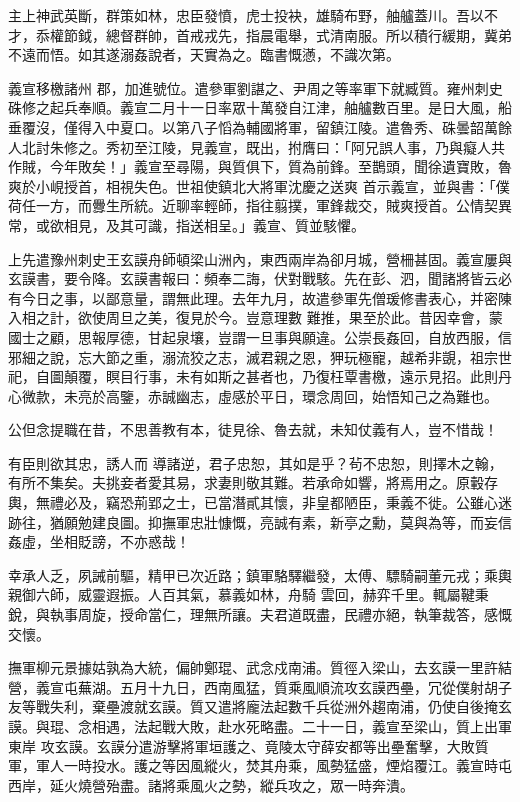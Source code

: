 \begin{pinyinscope}
 主上神武英斷，群策如林，忠臣發憤，虎士投袂，雄騎布野，舳艫蓋川。吾以不才，忝權節鉞，總督群帥，首戒戎先，指晨電舉，式清南服。所以積行緩期，冀弟不遠而悟。如其遂溺姦說者，天實為之。臨書慨懣，不識次第。



 義宣移檄諸州
 郡，加進號位。遣參軍劉諶之、尹周之等率軍下就臧質。雍州刺史硃修之起兵奉順。義宣二月十一日率眾十萬發自江津，舳艫數百里。是日大風，船垂覆沒，僅得入中夏口。以第八子慆為輔國將軍，留鎮江陵。遣魯秀、硃曇韶萬餘人北討朱修之。秀初至江陵，見義宣，既出，拊膺曰：「阿兄誤人事，乃與癡人共作賊，今年敗矣！」義宣至尋陽，與質俱下，質為前鋒。至鵲頭，聞徐遺寶敗，魯爽於小峴授首，相視失色。世祖使鎮北大將軍沈慶之送爽
 首示義宣，並與書：「僕荷任一方，而釁生所統。近聊率輕師，指往翦撲，軍鋒裁交，賊爽授首。公情契異常，或欲相見，及其可識，指送相呈。」義宣、質並駭懼。



 上先遣豫州刺史王玄謨舟師頓梁山洲內，東西兩岸為卻月城，營柵甚固。義宣屢與玄謨書，要令降。玄謨書報曰：頻奉二誨，伏對戰駭。先在彭、泗，聞諸將皆云必有今日之事，以鄙意量，謂無此理。去年九月，故遣參軍先僧瑗修書表心，并密陳入相之計，欲使周旦之美，復見於今。豈意理數
 難推，果至於此。昔因幸會，蒙國士之顧，思報厚德，甘起泉壤，豈謂一旦事與願違。公崇長姦回，自放西服，信邪細之說，忘大節之重，溺流狡之志，滅君親之恩，狎玩極寵，越希非覬，祖宗世祀，自圖顛覆，瞑目行事，未有如斯之甚者也，乃復枉覃書檄，遠示見招。此則丹心微款，未亮於高鑒，赤誠幽志，虛感於平日，環念周回，始悟知己之為難也。



 公但念提職在昔，不思善教有本，徒見徐、魯去就，未知仗義有人，豈不惜哉！



 有臣則欲其忠，誘人而
 導諸逆，君子忠恕，其如是乎？茍不忠恕，則擇木之翰，有所不集矣。夫挑妾者愛其易，求妻則敬其難。若承命如響，將焉用之。原轂存輿，無禮必及，竊恐荊郢之士，已當潛貳其懷，非皇都陋臣，秉義不徙。公雖心迷跡往，猶願勉建良圖。抑撫軍忠壯慷慨，亮誠有素，新亭之勳，莫與為等，而妄信姦虛，坐相貶謗，不亦惑哉！



 幸承人乏，夙誡前驅，精甲已次近路；鎮軍駱驛繼發，太傅、驃騎嗣董元戎；乘輿親御六師，威靈遐振。人百其氣，慕義如林，舟騎
 雲回，赫弈千里。輒屬鞬秉銳，與執事周旋，授命當仁，理無所讓。夫君道既盡，民禮亦絕，執筆裁答，感慨交懷。



 撫軍柳元景據姑孰為大統，偏帥鄭琨、武念戍南浦。質徑入梁山，去玄謨一里許結營，義宣屯蕪湖。五月十九日，西南風猛，質乘風順流攻玄謨西壘，冗從僕射胡子友等戰失利，棄壘渡就玄謨。質又遣將龐法起數千兵從洲外趨南浦，仍使自後掩玄謨。與琨、念相遇，法起戰大敗，赴水死略盡。二十一日，義宣至梁山，質上出軍東岸
 攻玄謨。玄謨分遣游擊將軍垣護之、竟陵太守薛安都等出壘奮擊，大敗質軍，軍人一時投水。護之等因風縱火，焚其舟乘，風勢猛盛，煙焰覆江。義宣時屯西岸，延火燒營殆盡。諸將乘風火之勢，縱兵攻之，眾一時奔潰。




\end{pinyinscope}
